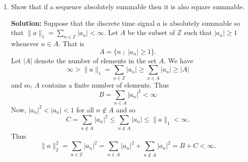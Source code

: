 \documentclass[11pt,a4paper]{book}
\theoremstyle{plain}
\numberwithin{equation}{section}
\newcommand{\ints}{{\mathbb Z}}
\renewcommand{\mid}{\; ; \;}
\newcommand{\abs}[1]{\left\vert #1 \right\vert}
\newenvironment{solution}{\begin{footnotesize}\textbf{Solution:}}{\end{footnotesize}}
\newenvironment{excersizelist}{%
  \renewcommand*{\theenumi}{\thechapter.\arabic{enumi}}%
  \newcommand\itemadvanced{\stepcounter{enumi}\item[$\ast$\, \theenumi.]}
  \begin{enumerate}
}{%
  \end{enumerate}
}
\begin{document}
\begin{excersizelist}
\item \label{excer:sumsqreexp} Show that if a sequence absolutely summable then it is also square summable.
\begin{solution}
Suppose that the discrete time signal $a$ is absolutely summable so that $\|a\|_1 = \sum_{n\in\ints} \abs{a_n} < \infty$.  Let $A$ be the subset of $\ints$ such that $\abs{a_n} \geq 1$ whenever $n \in A$.  That is
\[
A = \{ n \mid \abs{a_n} \geq 1 \}.
\]
Let $\abs{A}$ denote the number of elements in the set $A$.  We have
\[
\infty > \|a\|_1 = \sum_{n\in\ints} \abs{a_n} \geq \sum_{n \in A} \abs{a_n} \geq \abs{A}
\]
and so, $A$ contains a finite number of elements.  Thus
\[
B = \sum_{n \in A} \abs{a_n}^2 < \infty
\]
Now, $\abs{a_n}^2 < \abs{a_n}< 1$ for all $n \notin A$ and so 
\[
C = \sum_{n \notin A} \abs{a_n}^2 \leq \sum_{n \notin A} \abs{a_n} \leq \|a\|_1 < \infty.
\]
Thus
\[
\|a\|_2^2 = \sum_{n \in \ints} \abs{a_n}^2 = \sum_{n \in A} \abs{a_n}^2 + \sum_{n \notin A} \abs{a_n}^2 = B + C < \infty.
\]
\end{solution}


\end{excersizelist}
\end{document}
